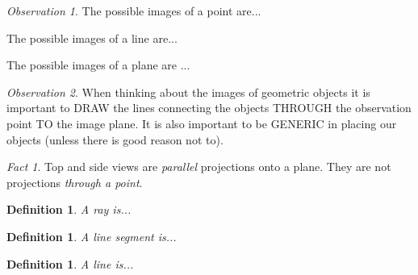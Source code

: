 \documentclass[12pt]{amsart}
\newtheorem{definition}[theorem]{Definition}
\theoremstyle{remark}
\newtheorem*{observation}{Observation}
\newtheorem*{basic notion}{Basic Notion}
\newtheorem{fact}{Fact}
\theoremstyle{mycomment}
\begin{document}
\begin{observation} The possible images of a point are...

The possible images of a line are...

The possible images of a plane are ...
\end{observation}
\begin{observation} When thinking about the images of geometric objects it is important to DRAW the lines connecting the objects THROUGH the observation point TO the image plane. It is also important to be GENERIC in placing our objects (unless there is good reason not to).\end{observation}
\begin{fact} Top and side views are \emph{parallel} projections onto a plane. They are not projections \emph{through a point}.\end{fact}
\begin{definition} A \emph{ray} is...
\end{definition}
\begin{definition} A \emph{line segment} is...
\end{definition}
\begin{definition} A \emph{line} is...
\end{definition}
\end{document}
